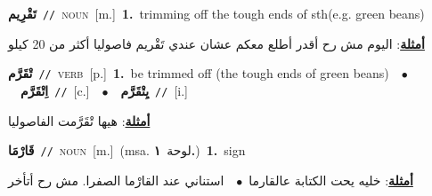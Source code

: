 \documentclass[10pt,a4paper,twoside]{article} %
\begin{document}
\begin{multicols}{2}
{\setlength\topsep{0pt}\textbf{\foreignlanguage{arabic}{تَقْرِيم}}\ {\color{gray}\texttt{//}\color{black}}\ \textsc{noun}\ [m.]\ \textbf{1.}~trimming off the tough ends of sth(e.g. green beans)\  \begin{flushright}\color{gray}\foreignlanguage{arabic}{\textbf{\underline{\foreignlanguage{arabic}{أمثلة}}}: اليوم مش رح أقدر أطلع معكم عشان عندي تَقْريم فاصوليا أكثر من 20 كيلو}\end{flushright}\color{black}} \vspace{2mm}

{\setlength\topsep{0pt}\textbf{\foreignlanguage{arabic}{تْقَرَّم}}\ {\color{gray}\texttt{//}\color{black}}\ \textsc{verb}\ [p.]\ \textbf{1.}~be trimmed off (the tough ends of green beans)\ \ $\bullet$\ \ \setlength\topsep{0pt}\textbf{\foreignlanguage{arabic}{اِتْقَرَّم}}\ {\color{gray}\texttt{//}\color{black}}\ [c.]\ \ $\bullet$\ \ \setlength\topsep{0pt}\textbf{\foreignlanguage{arabic}{يِتْقَرَّم}}\ {\color{gray}\texttt{//}\color{black}}\ [i.]\  \begin{flushright}\color{gray}\foreignlanguage{arabic}{\textbf{\underline{\foreignlanguage{arabic}{أمثلة}}}: هيها تْقَرَّمت الفاصوليا}\end{flushright}\color{black}} \vspace{2mm}

{\setlength\topsep{0pt}\textbf{\foreignlanguage{arabic}{قَارْمَا}}\ {\color{gray}\texttt{//}\color{black}}\ \textsc{noun}\ [m.]\ \color{gray}(msa. \foreignlanguage{arabic}{لوحة}~\foreignlanguage{arabic}{\textbf{١.}})\color{black}\ \textbf{1.}~sign\  \begin{flushright}\color{gray}\foreignlanguage{arabic}{\textbf{\underline{\foreignlanguage{arabic}{أمثلة}}}: خليه يحت الكتابة عالقارما\ $\bullet$\ \  استناني عند القارْما الصفرا. مش رح أتأخر}\end{flushright}\color{black}} \vspace{2mm}


\end{multicols}
\end{document}
